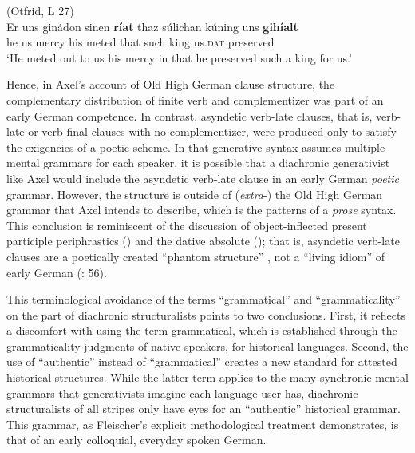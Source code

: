 \ea%
    \label{ex:2:8}(Otfrid, L 27)\\
\gll           Er  uns  ginádon  sinen  \textbf{ríat}       thaz     súlichan   kúning  uns    \textbf{gihíalt}\\
he  us   mercy  his     meted     that     such    king  us.\textsc{dat}  preserved\\
\glt ‘He meted out to us his mercy in that he preserved such a king for us.’
    \z

\noindent Hence, in Axel’s account of Old High German clause structure, the complementary distribution of finite verb and complementizer was part of an early German competence. In contrast, asyndetic verb-late clauses, that is, verb-late or verb-final clauses with no complementizer, were produced only to satisfy the exigencies of a poetic scheme. In that generative syntax assumes multiple mental grammars for each speaker, it is possible that a diachronic generativist like Axel would include the asyndetic verb-late clause in an early German \textit{poetic} grammar. However, the structure is outside of (\textit{extra}{}-) the Old High German grammar that Axel intends to describe, which is the patterns of a \textit{prose} syntax. This conclusion is reminiscent of the discussion of object-inflected present participle periphrastics () and the dative absolute (); that is, asyndetic verb-late clauses are a poetically created “phantom structure” \citep[421]{Nemitz1962}, not a “living idiom” of early German (\citealt{Gelderen1991}: 56).

This terminological avoidance of the terms “grammatical” and “grammaticality” on the part of diachronic structuralists points to two conclusions. First, it reflects a discomfort with using the term grammatical, which is established through the grammaticality judgments of native speakers, for historical languages. Second, the use of “authentic” instead of “grammatical” creates a new standard for attested historical structures. While the latter term applies to the many synchronic mental grammars that generativists imagine each language user has, diachronic structuralists of all stripes only have eyes for an “authentic” historical grammar. This grammar, as Fleischer’s explicit methodological treatment demonstrates, is that of an early colloquial, everyday spoken German.

